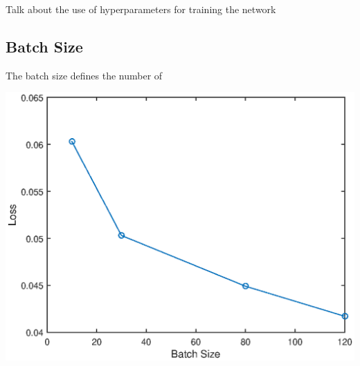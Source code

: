 \documentclass[a4paper]{article}
\begin{document}
Talk about the use of hyperparameters for training the network



\subsection{Batch Size}
\begin{minipage}{0.45\textwidth}
The batch size defines the number of 
\end{minipage}
\hspace{1cm}
\begin{minipage}{0.45\textwidth}
\centering
\includegraphics[scale=0.5]{hyp_par_1}
\end{minipage}
\end{document}
